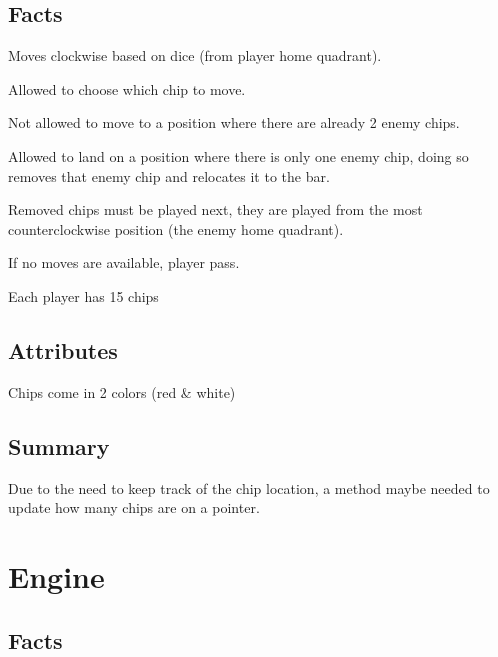 \documentclass{report}
\begin{document}
\subsection{Facts}
\begin{dashed}
    \item Moves clockwise based on dice (from player home quadrant).
    \item Allowed to choose which chip to move.
    \item Not allowed to move to a position where there are already 2 enemy chips.
    \item Allowed to land on a position where there is only one enemy chip, doing so
      removes that enemy chip and relocates it to the bar.
    \item Removed chips must be played next, they are played from the most
      counterclockwise position (the enemy home quadrant).
    \item If no moves are available, player pass.
    \item Each player has 15 chips
\end{dashed}

\subsection{Attributes}

\begin{dashed}
    \item Chips come in 2 colors (red \& white)
\end{dashed}

\subsection{Summary}
Due to the need to keep track of the chip location, a method maybe needed to update how many chips
are on a pointer.

\section{Engine}

\subsection{Facts}
\end{document}
